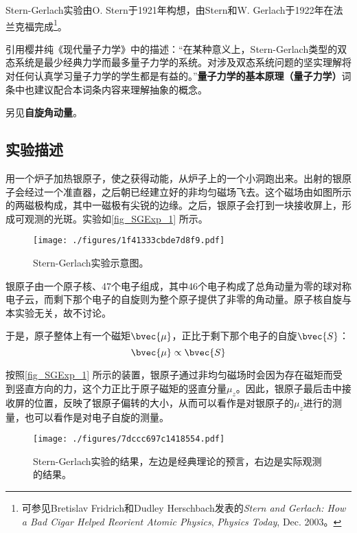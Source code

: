 


Stern-Gerlach实验由O. Stern于1921年构想，由Stern和W. Gerlach于1922年在法兰克福完成\footnote{可参见Bretislav Fridrich和Dudley Herschbach发表的\textsl{Stern and Gerlach: How a Bad Cigar Helped Reorient Atomic Physics}, \textsl{Physics Today}, Dec. 2003。}。

引用樱井纯《现代量子力学》中的描述：“在某种意义上，Stern-Gerlach类型的双态系统是最少经典力学而最多量子力学的系统。对涉及双态系统问题的坚实理解将对任何认真学习量子力学的学生都是有益的。”\textbf{量子力学的基本原理（量子力学）}词条中也建议配合本词条内容来理解抽象的概念。

另见\textbf{自旋角动量}。


\subsection{实验描述}

用一个炉子加热银原子，使之获得动能，从炉子上的一个小洞跑出来。出射的银原子会经过一个准直器，之后朝已经建立好的非均匀磁场飞去。这个磁场由如图所示的两磁极构成，其中一磁极有尖锐的边缘。之后，银原子会打到一块接收屏上，形成可观测的光斑。实验如\autoref{fig_SGExp_1} 所示。


\begin{figure}[ht]
\centering
\texttt{[image: ./figures/1f41333cbde7d8f9.pdf]}
\caption{Stern-Gerlach实验示意图。} \label{fig_SGExp_1}
\end{figure}

银原子由一个原子核、47个电子组成，其中46个电子构成了总角动量为零的球对称电子云，而剩下那个电子的自旋则为整个原子提供了非零的角动量。原子核自旋与本实验无关，故不讨论。

于是，原子整体上有一个磁矩$\bvec{\mu}$，正比于剩下那个电子的自旋$\bvec{S}$：
\begin{equation}
\bvec{\mu}\propto\bvec{S}
\end{equation}

按照\autoref{fig_SGExp_1} 所示的装置，银原子通过非均匀磁场时会因为存在磁矩而受到竖直方向的力，这个力正比于原子磁矩的竖直分量$\mu_z$。因此，银原子最后击中接收屏的位置，反映了银原子偏转的大小，从而可以看作是对银原子的$\mu_z$进行的测量，也可以看作是对电子自旋的测量。




\begin{figure}[ht]
\centering
\texttt{[image: ./figures/7dccc697c1418554.pdf]}
\caption{Stern-Gerlach实验的结果，左边是经典理论的预言，右边是实际观测的结果。} \label{fig_SGExp_2}
\end{figure}


